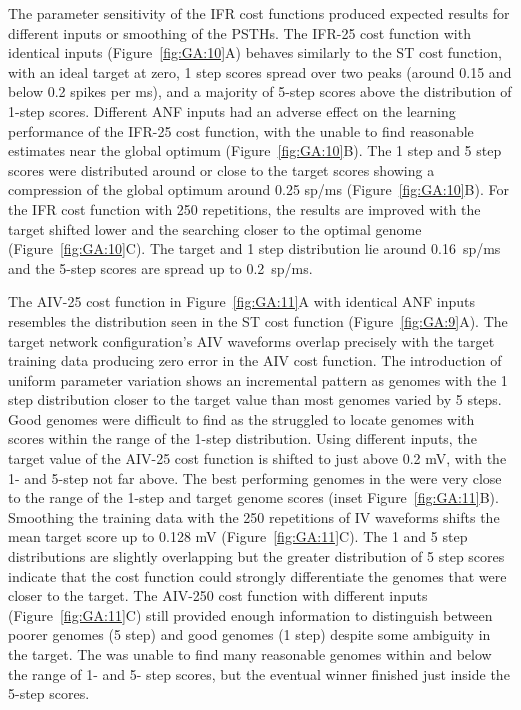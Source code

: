 \smallskip{}

The parameter sensitivity of the IFR cost functions produced expected
results for different {\ANF} inputs or smoothing of the PSTHs.  The
IFR-25 cost function with identical inputs (Figure~\ref{fig:GA:10}A) behaves similarly to the ST
cost function, with an ideal target at zero, 1 step scores spread over
two peaks (around 0.15 and below 0.2 spikes per ms), and a majority of
5-step scores above the distribution of 1-step scores.  Different ANF
inputs had an adverse effect on the learning performance of the IFR-25
cost function, with the {\GA} unable to find reasonable estimates near
the global optimum (Figure~\ref{fig:GA:10}B). The 1 step and 5 step scores were
distributed around or close to the target scores showing a compression
of the global optimum around 0.25 sp/ms (Figure~\ref{fig:GA:10}B).  For the IFR
cost function with 250 repetitions, the results are improved with the
target shifted lower and the {\GA} searching closer to the optimal
genome (Figure~\ref{fig:GA:10}C). The target and 1 step distribution lie around
0.16~sp/ms and the 5-step scores are spread up to 0.2~sp/ms.

\smallskip{}

The AIV-25 cost function in Figure~\ref{fig:GA:11}A with identical ANF
inputs resembles the distribution seen in the ST cost function
(Figure~\ref{fig:GA:9}A).  The target network configuration's AIV
waveforms overlap precisely with the target training data producing
zero error in the AIV cost function. The introduction of uniform
parameter variation shows an incremental pattern as genomes with the 1
step distribution closer to the target value than most genomes varied
by 5 steps.  Good genomes were difficult to find as the {\GA} struggled
to locate genomes with scores within the range of the 1-step
distribution. Using different inputs, the target value of the AIV-25
cost function is shifted to just above 0.2 mV, with the 1- and 5-step
not far above. The best performing genomes in the {\GA} were very close
to the range of the 1-step and target genome scores (inset
Figure~\ref{fig:GA:11}B). Smoothing the training data with the 250
repetitions of IV waveforms shifts the mean target score up to 0.128
mV (Figure~\ref{fig:GA:11}C).  The 1 and 5 step distributions are
slightly overlapping but the greater distribution of 5 step scores
indicate that the cost function could strongly differentiate the
genomes that were closer to the target.  The AIV-250 cost function
with different {\ANF} inputs (Figure~\ref{fig:GA:11}C) still provided
enough information to distinguish between poorer genomes (5 step) and
good genomes (1 step) despite some ambiguity in the target.  The {\GA}
was unable to find many reasonable genomes within and below the range
of 1- and 5- step scores, but the eventual winner finished just inside
the 5-step scores.




